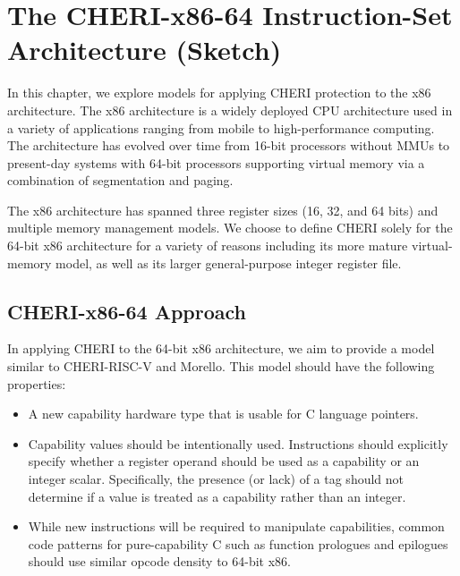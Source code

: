 \chapter{The CHERI-x86-64 Instruction-Set Architecture (Sketch)}
\label{chap:cheri-x86-64}


In this chapter, we explore models for applying CHERI protection to the x86
architecture.
The x86 architecture is a widely deployed CPU architecture used in a
variety of applications ranging from mobile to high-performance computing.
The architecture has evolved over time from 16-bit processors without
MMUs to present-day systems with 64-bit processors supporting virtual
memory via a combination of segmentation and paging.

The x86 architecture has spanned three register sizes (16, 32, and
64 bits) and multiple memory management models.  We choose to define
CHERI solely for the 64-bit x86 architecture for a variety of reasons
including its more mature virtual-memory model, as well as its larger
general-purpose integer register file.

\section{CHERI-x86-64 Approach}

In applying CHERI to the 64-bit x86 architecture, we aim to provide a
model similar to CHERI-RISC-V and Morello.  This model should have the
following properties:

\begin{itemize}
\item A new capability hardware type that is usable for C language
  pointers.

\item Capability values should be intentionally used.  Instructions
  should explicitly specify whether a register operand should be used as a
  capability or an integer scalar.  Specifically, the presence (or
  lack) of a tag should not determine if a value is treated as a
  capability rather than an integer.

\item While new instructions will be required to manipulate
  capabilities, common code patterns for pure-capability C such as
  function prologues and epilogues should use similar opcode density
  to 64-bit x86.
\end{itemize}

